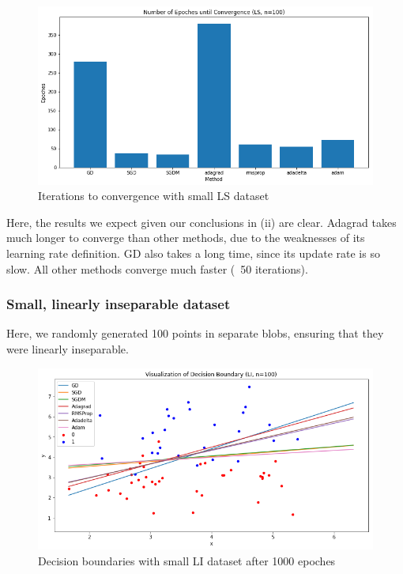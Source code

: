 \documentclass[twoside,11pt]{homework}
\begin{document}
 
\begin{figure}[H]
		\centering
		\includegraphics[scale=.5]{q5/sep_100/time.png}	
		\caption{Iterations to convergence with small LS dataset}
	\end{figure}
	
Here, the results we expect given our conclusions in (ii) are clear. Adagrad takes much longer to converge than other methods, due to the weaknesses of its learning rate definition. GD also takes a long time, since its update rate is so slow. All other methods converge much faster (~50 iterations).
	

\subsubsection*{Small, linearly inseparable dataset}
Here, we randomly generated 100 points in separate blobs, ensuring that they were linearly inseparable. 
\begin{figure}[H]
		\centering
		\includegraphics[scale=.5]{q5/insep_100/lines.png}	
		\caption{Decision boundaries with small LI dataset after 1000 epoches}
	\end{figure}
	
\end{document}
